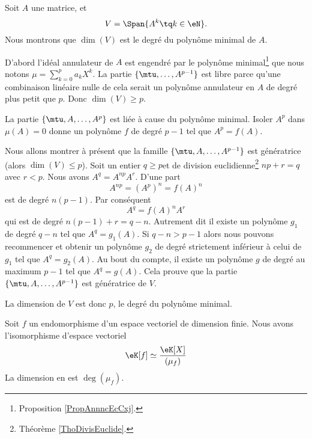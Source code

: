 \begin{example}
    Soit \( A\) une matrice, et 
    \begin{equation}
        V=\Span\{A^k\tq k\in \eN \}.
    \end{equation}
    Nous montrons que \( \dim(V)\) est le degré du polynôme minimal de \( A\).

    D'abord l'idéal annulateur de \( A\) est engendré par le polynôme minimal\footnote{Proposition \ref{PropAnnncEcCxj}.} que nous notons
        $\mu=\sum_{k=0}^pa_kX^k$.
    La partie \( \{ \mtu,\ldots, A^{p-1} \}\) est libre parce qu'une combinaison linéaire nulle de cela serait un polynôme annulateur en \( A\) de degré plus petit que \( p\). Donc \( \dim(V)\geq p\).

    La partie \( \{ \mtu,A,\ldots, A^p \}\) est liée à cause du polynôme minimal. Isoler \( A^p\) dans \( \mu(A)=0\) donne un polynôme \( f\) de degré \( p-1\) tel que \( A^p=f(A)\).

    Nous allons montrer à présent que la famille \( \{ \mtu,A,\ldots, A^{p-1} \}\) est génératrice (alors \( \dim(V)\leq p\)). Soit un entier \( q\geq p\)et de division euclidienne\footnote{Théorème \ref{ThoDivisEuclide}.} \( np+r=q\) avec \( r<p\). Nous avons \( A^q=A^{np}A^r\). D'une part
    \begin{equation}
        A^{np}=(A^p)^n=f(A)^n
    \end{equation}
    est de degré \( n(p-1)\). Par conséquent
    \begin{equation}
        A^q=f(A)^nA^r
    \end{equation}
    qui est de degré \( n(p-1)+r=q-n\). Autrement dit il existe un polynôme \( g_1\) de degré \( q-n\) tel que \( A^q=g_1(A)\). Si \( q-n>p-1\) alors nous pouvons recommencer et obtenir un polynôme \( g_2\) de degré strictement inférieur à celui de \( g_1\) tel que \( A^q=g_2(A)\). Au bout du compte, il existe un polynôme \( g\) de degré au maximum \( p-1\) tel que \( A^q=g(A)\). Cela prouve que la partie \( \{ \mtu,A,\ldots, A^{p-1} \}\) est génératrice de \( V\).

    La dimension de \( V\) est donc \( p\), le degré du polynôme minimal.
\end{example}

\begin{proposition}     \label{PropooCFZDooROVlaA}
    Soit \( f\) un endomorphisme d'un espace vectoriel de dimension finie. Nous avons l'isomorphisme d'espace vectoriel
    \begin{equation}
        \eK[f]\simeq\frac{ \eK[X] }{ (\mu_f) }
    \end{equation}
    La dimension en est \( \deg(\mu_f)\).
\end{proposition}

